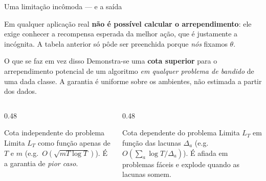 \documentclass[aspectratio=169, 10pt]{beamer}
\newcommand{\gap}{\Delta}
\newcommand{\Reg}{L}
\begin{document}
\begin{frame}{Uma limitação incômoda --- e a saída}
  \begin{alertabox}
    Em qualquer aplicação real \textbf{não é possível calcular o
    arrependimento}: ele exige conhecer a recompensa esperada da melhor
    ação, que é justamente a incógnita. A tabela anterior só pôde ser
    preenchida porque \emph{nós} fixamos $\theta$.
  \end{alertabox}

  \begin{defbox}{O que se faz em vez disso}
    Demonstra-se uma \textbf{cota superior} para o arrependimento potencial
    de um algoritmo \emph{em qualquer problema de bandido} de uma dada
    classe. A garantia é uniforme sobre os ambientes, não estimada a
    partir dos dados.
  \end{defbox}

  \vspace{-2mm}
  \begin{columns}[T]
    \begin{column}{0.48\textwidth}
      \begin{defbox}{Cota independente do problema}
        Limita $\Reg_T$ como função apenas de $T$ e $m$
        (e.g.\ $O(\sqrt{mT\log T})$). É a garantia de \emph{pior caso}.
      \end{defbox}
    \end{column}
    \begin{column}{0.48\textwidth}
      \begin{defbox}{Cota dependente do problema}
        Limita $\Reg_T$ em função das lacunas $\gap_a$
        (e.g.\ $O(\sum_a \log T / \gap_a)$). É afiada em problemas fáceis
        e explode quando as lacunas somem.
      \end{defbox}
    \end{column}
  \end{columns}
\end{frame}
\end{document}
